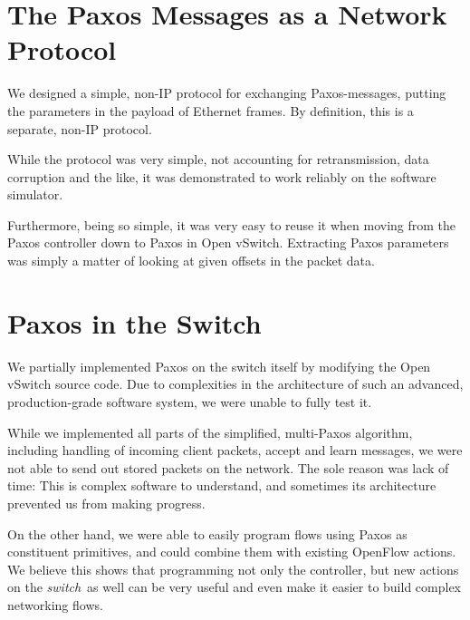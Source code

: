 \section{The Paxos Messages as a Network Protocol}

We designed a simple, non-IP protocol for exchanging Paxos-messages, putting
the parameters in the payload of Ethernet frames.  By definition, this is a
separate, non-IP protocol.

While the protocol was very simple, not accounting for retransmission,
data corruption and the like, it was demonstrated to work reliably on the
software simulator.

Furthermore, being so simple, it was very easy to reuse it when moving from
the Paxos controller down to Paxos in Open vSwitch.  Extracting Paxos
parameters was simply a matter of looking at given offsets in the packet
data.

\section{Paxos in the Switch}

We partially implemented Paxos on the switch itself by modifying the Open
vSwitch source code.  Due to complexities in the architecture of such an
advanced, production-grade software system, we were unable to fully test it.

While we implemented all parts of the simplified, multi-Paxos algorithm,
including handling of incoming client packets, accept and learn
messages, we were not able to send out stored packets on the network.
The sole reason was lack of time: This is complex software to understand,
and sometimes its architecture prevented us from making progress.

On the other hand, we were able to easily program flows using Paxos as
constituent primitives, and could combine them with existing OpenFlow
actions.  We believe this shows that programming not only the controller,
but new actions on the \textit{switch} as well can be very useful and even
make it easier to build complex networking flows.
